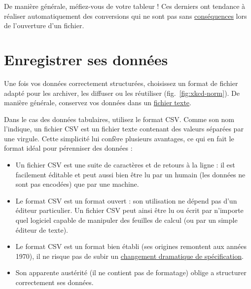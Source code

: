 \documentclass[
  french,
]{scrbook}
\providecommand{\tightlist}{%
  \setlength{\itemsep}{0pt}\setlength{\parskip}{0pt}}
\begin{document}
\begin{tcolorbox}[fonttitle=\sffamily\bfseries\large,title=Attention,colframe=darkred]

De manière générale, méfiez-vous de votre tableur ! Ces derniers ont tendance à réaliser automatiquement des conversions qui ne sont pas sans \href{https://www.theverge.com/2020/8/6/21355674/human-genes-rename-microsoft-excel-misreading-dates}{conséquences} lors de l'ouverture d'un fichier.

\end{tcolorbox}

\hypertarget{csv}{%
\section{Enregistrer ses données}\label{csv}}

Une fois vos données correctement structurées, choisissez un format de fichier adapté pour les archiver, les diffuser ou les réutiliser (fig.~\ref{fig:xkcd-norm}). De manière générale, conservez vos données dans un \href{https://fr.wikipedia.org/wiki/Fichier_texte}{fichier texte}.

Dans le cas des données tabulaires, utilisez le format CSV. Comme son nom l'indique, un fichier CSV est un fichier texte contenant des valeurs séparées par une virgule. Cette simplicité lui confère plusieurs avantages, ce qui en fait le format idéal pour pérenniser des données :

\begin{itemize}
\tightlist
\item
  Un fichier CSV est une suite de caractères et de retours à la ligne : il est facilement éditable et peut aussi bien être lu par un humain (les données ne sont pas encodées) que par une machine.
\item
  Le format CSV est un format ouvert : son utilisation ne dépend pas d'un éditeur particulier. Un fichier CSV peut ainsi être lu ou écrit par n'importe quel logiciel capable de manipuler des feuilles de calcul (ou par un simple éditeur de texte).
\item
  Le format CSV est un format bien établi (ses origines remontent aux années 1970), il ne risque pas de subir un \href{https://www.bbc.com/news/technology-54423988}{changement dramatique de spécification}.
\item
  Son apparente austérité (il ne contient pas de formatage) oblige a structurer correctement ses données.
\end{itemize}
\end{document}
